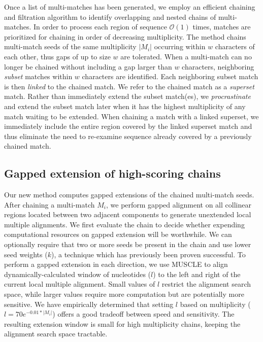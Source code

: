 \documentclass{llncs}
\begin{document}
Once a list of multi-matches has been generated, we employ an
efficient chaining and filtration algorithm to identify overlapping
and nested chains of multi-matches\cite{ref-procrast}. In order to
process each region of sequence $\mathcal{O}(1)$ times, matches
are prioritized for chaining in order of decreasing multiplicity.  The
method chains multi-match seeds of the same multiplicity $|M_i|$
occurring within $w$ characters of each other, thus gaps of up to size
$w$ are tolerated.  When a multi-match can
no longer be chained without including a gap larger than $w$
characters, neighboring \textit{subset} matches within $w$ characters
are identified. Each neighboring subset match is then \textit{linked}
to the chained match. We refer to the chained match as a
\textit{superset} match. Rather than immediately extend the subset
match(es), we \textit{procrastinate} and extend the subset match later
when it has the highest multiplicity of any match waiting to be
extended. When chaining a match with a linked superset, we immediately
include the entire region covered by the linked superset match and
thus eliminate the need to re-examine sequence already covered by a
previously chained match.

\subsection{Gapped extension of high-scoring chains}
Our new method computes gapped extensions of the chained multi-match seeds.
After chaining a multi-match $M_i$, we perform gapped alignment on all
collinear regions located between two adjacent components to generate
unextended local multiple alignments. We first evaluate the chain to
decide whether expending computational resources on gapped extension
will be worthwhile. We can optionally require that two or more seeds be present
in the chain and use lower seed weights ($k$), a technique which has
previously been proven
successful\cite{ref-blastz,ref-gappedblast,ref-blat}.  To perform a
gapped extension in each direction, we use MUSCLE to align dynamically-calculated window
of nucleotides ($l$) to the left and right of the current local
multiple alignment.  Small values of $l$ restrict the alignment search
space, while larger values require more computation but are
potentially more sensitive.  We have empirically determined that
setting $l$ based on multiplicity ($l = 70e^{-0.01*|M_{i}|}$) offers a
good tradeoff between speed and sensitivity.  The resulting extension
window is small for high multiplicity chains,
keeping the alignment search space tractable.
\end{document}
